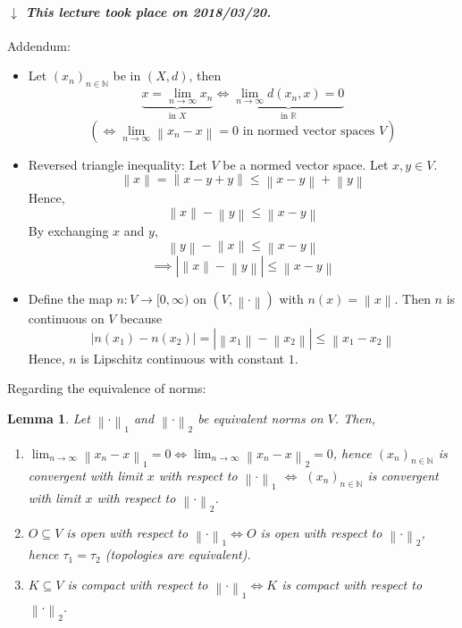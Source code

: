 \documentclass{article}
\newtheorem{lemma}{Lemma}  \numberwithin{lemma}{section}
\newcommand{\norm}[1]{\left\|#1\right\|}
\newcommand{\card}[1]{\left|#1\right|}
\newcommand{\dateref}[1]{%
  \begin{mdframed}[backgroundcolor=gray!10,innerbottommargin=0pt,innertopmargin=0pt]
    \paragraph{\textit{$\downarrow$ This lecture took place on #1.}}%
  \end{mdframed}%
}
\begin{document}
\dateref{2018/03/20}

Addendum:
\begin{itemize}
  \item Let $(x_n)_{n \in \mathbb N}$ be in $(X, d)$, then
    \[ \underbrace{x = \lim_{n\to\infty} x_n}_{\text{in } X} \iff \underbrace{\lim_{n\to\infty} d(x_n, x) = 0}_{\text{in } \mathbb R} \]
    \[ (\iff \lim_{n\to\infty} \norm{x_n - x} = 0 \text{ in normed vector spaces } V) \]
  \item Reversed triangle inequality: Let $V$ be a normed vector space. Let $x, y \in V$.
    \[ \norm{x} = \norm{x - y + y} \leq \norm{x - y} + \norm{y} \]
    Hence,
    \[ \norm{x} - \norm{y} \leq \norm{x - y} \]
    By exchanging $x$ and $y$,
    \[ \norm{y} - \norm{x} \leq \norm{x - y} \]
    \[ \implies \card{\norm x - \norm y} \leq \norm{x - y} \]
  \item Define the map $n: V \to [0, \infty)$ on $(V, \norm{\cdot})$ with $n(x) = \norm{x}$.
    Then $n$ is continuous on $V$ because
    \[ \card{n(x_1) - n(x_2)} = \card{\norm{x_1} - \norm{x_2}} \leq \norm{x_1 - x_2} \]
    Hence, $n$ is Lipschitz continuous with constant $1$.
\end{itemize}

Regarding the equivalence of norms:

\begin{lemma} %
  Let $\norm{\cdot}_1$ and $\norm{\cdot}_2$ be equivalent norms on $V$. Then,
  \begin{enumerate}
    \item $\lim_{n\to\infty} \norm{x_n - x}_1 = 0 \iff \lim_{n\to\infty} \norm{x_n - x}_2 = 0$,
      hence $(x_n)_{n\in\mathbb N}$ is convergent with limit $x$ with respect to $\norm{\cdot}_1$
      $\iff$ $(x_n)_{n\in\mathbb N}$ is convergent with limit $x$ with respect to $\norm{\cdot}_2$.
    \item $O \subseteq V$ is open with respect to $\norm{\cdot}_1 \iff O$ is open with respect to $\norm{\cdot}_2$,
      hence $\tau_1 = \tau_2$ (topologies are equivalent).
    \item $K \subseteq V$ is compact with respect to $\norm{\cdot}_1 \iff K$ is compact with respect to $\norm{\cdot}_2$.
  \end{enumerate}
\end{lemma}
\end{document}
